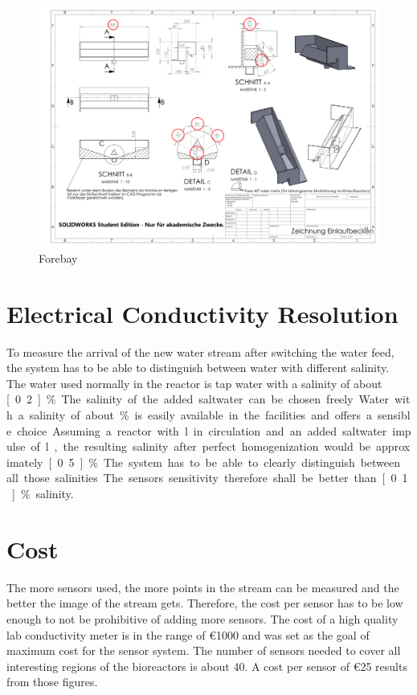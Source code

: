 \begin{figure}
	\begin{center}
		\includegraphics[width=\textwidth]{images/Einlaufbecken.pdf} 
		\caption{Forebay}
		\label{fig:elb}
	\end{center}
\end{figure}

\section{Electrical Conductivity Resolution}

To measure the arrival of the new water stream after switching the water feed, the system has to be able to distinguish between water with different salinity. The water used normally in the reactor is tap water with a salinity of about \unit[0.2]{\%}. The salinity of the added saltwater can be chosen freely. Water with a salinity of about \unit[5]{\%} is easily available in the facilities and offers a sensible choice. Assuming a reactor with \unit[65]{l} in circulation and an added saltwater impulse of \unit[5]{l}, the resulting salinity after perfect homogenization would be approximately \unit[0.5]{\%}. The system has to be able to clearly distinguish between all those salinities. The sensors sensitivity therefore shall be better than \unit[0.1]{\%} salinity.

\section{Cost}

The more sensors used, the more points in the stream can be measured and the better the image of the stream gets. Therefore, the cost per sensor has to be low enough to not be prohibitive of adding more sensors.
The cost of a high quality lab conductivity meter is in the range of \euro{1000} and was set as the goal of maximum cost for the sensor system. The number of sensors needed to cover all interesting regions of the bioreactors is about 40.
A cost per sensor of \euro{25} results from those figures.

